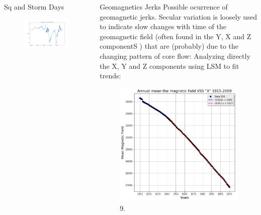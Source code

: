 \documentclass[final,t]{beamer}
\begin{document}
\begin{columns}[t]
\begin{column}{.66\linewidth}
\begin{columns}
\begin{column}{.31\linewidth}
\begin{block}{Sq and Storm Days}
	\justifying
\begin{figure}
\centering
\includegraphics[width=0.8\linewidth]{F27_31_october(2003)}
\label{fig:F27_31_october(2003)}
\end{figure}
	
	
\end{block}	
	

\end{column}


\begin{column}{.31\linewidth}
	
	
	\begin{block}{Geomagnetics Jerks}
		\justifying
		Possible ocurrence of geomagnetic jerks.
		Secular variation is loosely used to indicate slow changes with time of the geomagnetic field
		(often found in the Y, X and Z componentS ) that are (probably) due to the changing pattern of core
		flow:
		Analyzing directly the X, Y and Z components using LSM to fit trends: 	
		\begin{figure}
			\centering
			\includegraphics[width=0.5\linewidth]{retasX}
			\caption{9.}
			\label{w}
		\end{figure}	
		

\end{block}
\end{column}
\end{columns}
\end{column}
\end{columns}
\end{document}
